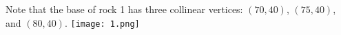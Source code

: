 Note that the base of rock 1 has three collinear vertices: $(70,40)$, $(75,40)$, and $(80,40)$.
\texttt{[image: 1.png]}